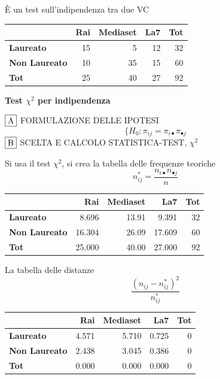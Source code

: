 \documentclass[
  11pt,
]{book}
\theoremstyle{mytheoremstyle}
\theoremstyle{mydefstyle}
\newenvironment{sol}
  {
  \begin{tcolorbox}[enhanced,breakable,arc=0.1mm,boxrule=1pt,colback=white,colframe=iblue,
  title=\bf \fontfamily{lmss}\selectfont \hspace{.5 cm} Soluzione,drop fuzzy shadow]

}{
\end{tcolorbox}
  }
\begin{document}
\begin{sol}
È un test sull'indipendenza tra due VC

\begin{table}[H]
\centering
\begin{tabular}{>{}lrrrr}
\toprule
  & Rai & Mediaset & La7 & Tot\\
\midrule
\textbf{Laureato} & 15 & 5 & 12 & 32\\
\textbf{Non Laureato} & 10 & 35 & 15 & 60\\
\textbf{Tot} & 25 & 40 & 27 & 92\\
\bottomrule
\end{tabular}
\end{table}

\textbf{Test \(\chi^2\) per indipendenza}

\(\fbox{A}\) FORMULAZIONE DELLE IPOTESI
\[
\Big\{H_0:\pi_{ij}=\pi_{i\bullet}\pi_{\bullet j}
\]
\(\fbox{B}\) SCELTA E CALCOLO STATISTICA-TEST, \(\chi^2\)

Si usa il test \(\chi^2\), si crea la tabella delle frequenze teoriche
\[
n_{ij}^*=\frac{n_{i\bullet}n_{\bullet j}}{n}
\]

\begin{table}[H]
\centering
\begin{tabular}{>{}lrrrr}
\toprule
  & Rai & Mediaset & La7 & Tot\\
\midrule
\textbf{Laureato} & 8.696 & 13.91 & 9.391 & 32\\
\textbf{Non Laureato} & 16.304 & 26.09 & 17.609 & 60\\
\textbf{Tot} & 25.000 & 40.00 & 27.000 & 92\\
\bottomrule
\end{tabular}
\end{table}

La tabella delle distanze
\[
\frac{(n_{ij}-n_{ij}^*)^2}{n_{ij}^*}
\]

\begin{table}[H]
\centering
\begin{tabular}{>{}lrrrr}
\toprule
  & Rai & Mediaset & La7 & Tot\\
\midrule
\textbf{Laureato} & 4.571 & 5.710 & 0.725 & 0\\
\textbf{Non Laureato} & 2.438 & 3.045 & 0.386 & 0\\
\textbf{Tot} & 0.000 & 0.000 & 0.000 & 0\\
\bottomrule
\end{tabular}
\end{table}


\end{sol}
\end{document}
